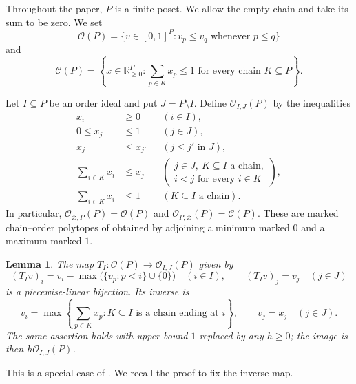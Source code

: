 \documentclass[a4paper,12pt]{amsart}
\newtheorem{lemma}[theorem]{Lemma}
\theoremstyle{definition}
\theoremstyle{remark}
\newcommand{\OO}{\mathcal O}
\newcommand{\CC}{\mathcal C}
\begin{document}
Throughout the paper, $P$ is a finite poset. 
We allow the empty chain and take its sum to be zero. 
We set
\[
 \OO(P)=\{v\in[0,1]^P:v_p\leq v_q\text{ whenever }p\leq q\}
\]
and
\[
 \CC(P)=\left\{x\in\mathbb R_{\geq0}^P: \sum_{p\in K}x_p\leq1\text{ for every chain }K\subseteq P\right\}.
\]

Let $I\subseteq P$ be an order ideal and put $J=P\setminus I$.  
Define $\OO_{I,J}(P)$ by the inequalities
\begin{align*}
 x_i&\geq0 &&(i\in I),\\
 0\leq x_j&\leq1 &&(j\in J),\\
 x_j&\leq x_{j'} &&(j\leq j'\text{ in }J),\\
 \sum_{i\in K}x_i&\leq x_j    &&\left(\substack{j\in J,\ K\subseteq I\text{ a chain},\\
 i<j\text{ for every }i\in K}\right),\\
 \sum_{i\in K}x_i&\leq1 &&(K\subseteq I\text{ a chain}).
\end{align*}
In particular, $\OO_{\varnothing,P}(P)=\OO(P)$ and $\OO_{P,\varnothing}(P)=\CC(P)$.  
These are marked chain--order polytopes of \cite{FF16,Fan+20} obtained by adjoining a minimum marked $0$ and a maximum marked $1$.

\begin{lemma}\label{lem:transfer}
The map $T_I:\OO(P)\to\OO_{I,J}(P)$ given by
\[
 (T_Iv)_i=v_i-\max\bigl(\{v_p:p<i\}\cup\{0\}\bigr)\quad(i\in I),  \qquad  (T_Iv)_j=v_j\quad(j\in J)
\]
is a piecewise-linear bijection.  Its inverse is
\[
 v_i=\max\left\{\sum_{p\in K}x_p: K\subseteq I\text{ is a chain ending at }i\right\}, \qquad v_j=x_j\quad(j\in J).
\]
The same assertion holds with upper bound $1$ replaced by any $h\geq0$; the image is then $h\OO_{I,J}(P)$.
\end{lemma}

This is a special case of \cite[Theorem~2.1]{Fan+20}.
We recall the proof to fix the inverse map.
\end{document}
